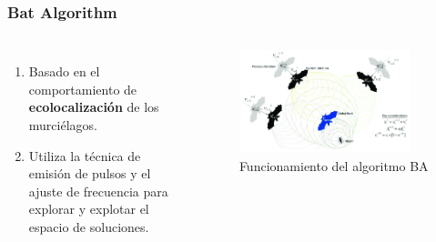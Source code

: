 \begin{frame}
  \frametitle{Bat Algorithm}
  \begin{columns}
    \begin{enumerate}
      \item Basado en el comportamiento de \textbf{ecolocalización} de los murciélagos.
      \item Utiliza la técnica de emisión de pulsos y el ajuste de frecuencia para explorar y explotar el espacio de soluciones.
    \end{enumerate}
    \begin{figure}
      \begin{center}
        \includegraphics[width=0.9\textwidth]{imagenes/chapter3/ba.png}
      \end{center}
      \caption{Funcionamiento del algoritmo BA}
    \end{figure}
  \end{columns}
\end{frame}


